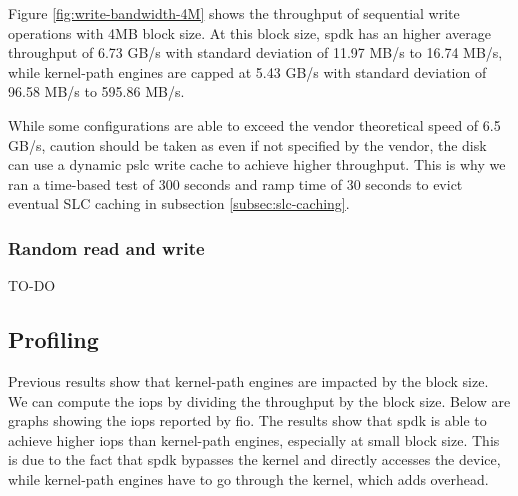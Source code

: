 Figure \ref{fig:write-bandwidth-4M} shows the throughput of sequential write operations with 4MB block size. At this block size, \acrshort{spdk} has an higher average throughput of 6.73 GB/s with standard deviation of 11.97 MB/s to 16.74 MB/s, while kernel-path engines are capped at 5.43 GB/s with standard deviation of 96.58 MB/s to 595.86 MB/s.

While some configurations are able to exceed the vendor theoretical speed of 6.5 GB/s, caution should be taken as even if not specified by the vendor, the disk can use a dynamic \acrshort{pslc} write cache to achieve higher throughput. This is why we ran a time-based test of 300 seconds and ramp time of 30 seconds to evict eventual SLC caching in subsection \ref{subsec:slc-caching}.

\subsubsection{Random read and write}

    TO-DO

\subsection{Profiling}

    Previous results show that kernel-path engines are impacted by the block size. We can compute the \acrfull{iops}  by dividing the throughput by the block size. Below are graphs showing the \acrshort{iops} reported by \acrshort{fio}. The results show that \acrshort{spdk} is able to achieve higher \acrshort{iops} than kernel-path engines, especially at small block size. This is due to the fact that \acrshort{spdk} bypasses the kernel and directly accesses the device, while kernel-path engines have to go through the kernel, which adds overhead.

